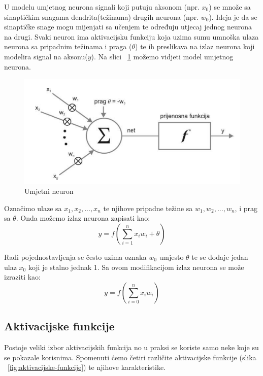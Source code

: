 \documentclass[times, utf8, zavrsni, numeric]{fer}
\begin{document}
U modelu umjetnog neurona signali koji putuju aksonom (npr. \textbf{$x_{0}$}) se množe sa sinaptičkim snagama dendrita(težinama) drugih neurona (npr. \textbf{$w_{0}$}). Ideja je da se sinaptičke snage mogu mijenjati sa učenjem te određuju utjecaj jednog neurona na drugi. Svaki neuron ima aktivacijsku funkciju koja uzima sumu umnoška ulaza neurona sa pripadnim težinama i praga ($\theta$) te ih preslikava na izlaz neurona koji modelira signal na aksonu($y$). Na slici ~\ref{fig:umj-neuron} možemo vidjeti model umjetnog neurona. 
\begin{figure}
    \centering
    \includegraphics[width=12cm]{img/umj-neuron.png}
    \caption{Umjetni neuron}
    \label{fig:umj-neuron}
\end{figure}

Označimo ulaze sa $x_{1},x_{2},...,x_{n}$ te njihove pripadne težine sa $w_{1},w_{2},...,w_{n}$, i prag sa $\theta$. Onda možemo izlaz neurona zapisati kao:
\begin{equation}
y = f(\displaystyle\sum_{i=1}^{n}x_iw_i + \theta)
\end{equation}

Radi pojednostavljenja se često uzima oznaka $w_0$ umjesto $\theta$ te se dodaje jedan ulaz $x_0$ koji je stalno jednak 1. Sa ovom modifikacijom izlaz neurona se može izraziti kao:
\begin{equation}
y = f(\displaystyle\sum_{i=0}^{n}x_iw_i)
\end{equation}
\subsection{Aktivacijske funkcije}\label{Aktivacijske funkcije}
Postoje veliki izbor aktivacijskih funkcija no u praksi se koriste samo neke koje su se pokazale korisnima. Spomenuti ćemo četiri različite aktivacijske funkcije (slika ~\ref{fig:aktivacijske-funkcije}) te njihove karakteristike.
\end{document}
